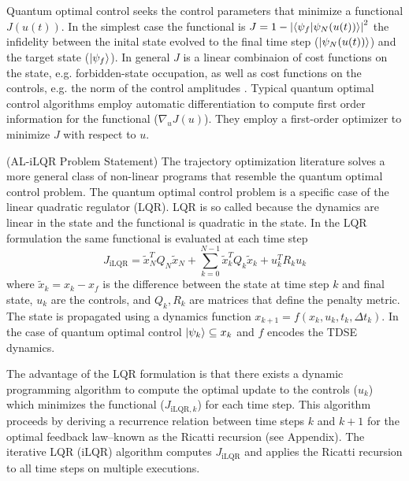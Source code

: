 \documentclass[
  amsfonts,
  amsmath,
  tbtags,
  amssymb,
  aps,
  nobibnotes,
  twocolumn,
]{revtex4-2}
\begin{document}
Quantum optimal control seeks the control
parameters that minimize a functional $J(u(t))$.
In the simplest case the functional is
$J = 1 - {\lvert \braket{\psi_{f} \lvert \psi_{N}(u(t))} \rvert}^{2}$
the infidelity between the inital state evolved
to the final time step ($\ket{\psi_{N}(u(t))}$)
and the target state ($\ket{\psi_{f}}$). In general
$J$ is a linear combinaion of cost functions on the state, e.g.
forbidden-state occupation, as well as
cost functions on the controls, e.g. the norm of the control amplitudes
\cite{leung2017speedup}. Typical quantum optimal control
algorithms employ automatic differentiation
to compute first order information for the functional ($\nabla_{u} J(u)$).
They employ a first-order optimizer to minimize $J$ with respect to $u$.

(AL-iLQR Problem Statement) The trajectory optimization
literature solves a more general class of non-linear programs that resemble
the quantum optimal control problem. The quantum optimal control
problem is a specific case of the linear quadratic regulator (LQR).
LQR is so called because the dynamics are linear in the state and
the functional is quadratic in the state. In the LQR formulation
the same functional is evaluated at each time step
\begin{equation}
  J_{\textrm{iLQR}} = \tilde{x}_{N}^{T} Q_{N} \tilde{x}_{N}
  + \sum_{k = 0}^{N - 1} \tilde{x}_{k}^{T} Q_{k} \tilde{x}_{k} + u_{k}^{T} R_{k} u_{k}
\end{equation}
where $\tilde{x}_{k} = x_{k} - x_{f}$ is the difference between the state
at time step $k$ and final state, $u_{k}$ are the controls,
and $Q_{k}, R_{k}$ are matrices that define the penalty metric.
The state is propagated using a dynamics function
$x_{k + 1} = f(x_{k}, u_{k}, t_{k}, \Delta t_{k})$.
In the case of quantum optimal control $\ket{\psi_{k}} \subseteq x_{k}$
and $f$ encodes the TDSE dynamics.

The advantage of the LQR formulation
is that there exists a dynamic programming algorithm to compute the
optimal update to the controls ($u_{k}$) which minimizes the functional
($J_{\textrm{iLQR}, k}$) for each time step. This algorithm proceeds by deriving a
recurrence relation between time steps $k$ and $k + 1$ for the optimal
feedback law--known as the Ricatti recursion (see Appendix). The
iterative LQR (iLQR) algorithm computes $J_{\textrm{iLQR}}$
and applies the Ricatti recursion to all time steps on multiple
executions.
\end{document}
